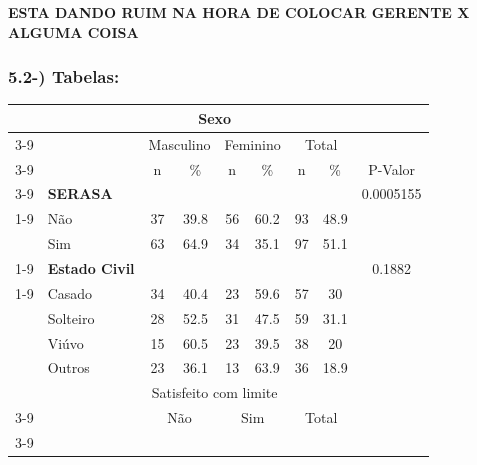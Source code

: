 \documentclass[]{article}
\begin{document}
\textbf{ESTA DANDO RUIM NA HORA DE COLOCAR GERENTE X ALGUMA COISA}

\subsubsection{5.2-) Tabelas:}\label{tabelas}

\begin{table}[t!]
    \centering
        \begin{tabular}{c c c c c c c c c}
            \toprule
            \midrule
                & & \multicolumn{4}{c}{Sexo}\\ \cmidrule{3-9}
                && \multicolumn{2}{c}{Masculino} & \multicolumn{2}{c}{Feminino} & \multicolumn{2}{c}{Total} \\ \cmidrule{3-9}
                && n & \% & n & \% & n & \% & P-Valor \\ \cmidrule{3-9}
                \multicolumn{1}{c}{\multirow{5}{*}}   &
                \multicolumn{1}{l}{\textbf{SERASA}} &  &  &  & & &  & 0.0005155 \\ \cmidrule{1-9}
                \multicolumn{1}{c}{}    &
                \multicolumn{1}{l}{Não} & 37 & 39.8 & 56 & 60.2 & 93 & 48.9 &  \\
                \multicolumn{1}{c}{}    &
                \multicolumn{1}{l}{Sim}& 63 & 64.9 & 34 & 35.1 & 97 & 51.1  \\ \cmidrule{1-9} &
                \multicolumn{1}{l}{\textbf{Estado Civil}} &  &  &  & & &  & 0.1882 \\ \cmidrule{1-9}                
                \multicolumn{1}{c}{}    &
                \multicolumn{1}{l}{Casado} & 34 & 40.4 & 23 & 59.6 & 57 & 30 &  \\
                \multicolumn{1}{c}{}    &   
                \multicolumn{1}{l}{Solteiro} & 28 & 52.5 & 31 & 47.5 & 59 & 31.1 &  \\
                \multicolumn{1}{c}{}    &
                \multicolumn{1}{l}{Viúvo} & 15 & 60.5 & 23 & 39.5 & 38 & 20   \\
                \multicolumn{1}{c}{}    &
                \multicolumn{1}{l}{Outros} & 23 & 36.1 & 13 & 63.9& 36 & 18.9   \\  
                \toprule
                \midrule 
                & & \multicolumn{4}{c}{Satisfeito com limite}\\ \cmidrule{3-9}
                && \multicolumn{2}{c}{Não} & \multicolumn{2}{c}{Sim} & \multicolumn{2}{c}{Total}  \\ \cmidrule{3-9}

\end{tabular}
\end{table}
\end{document}
